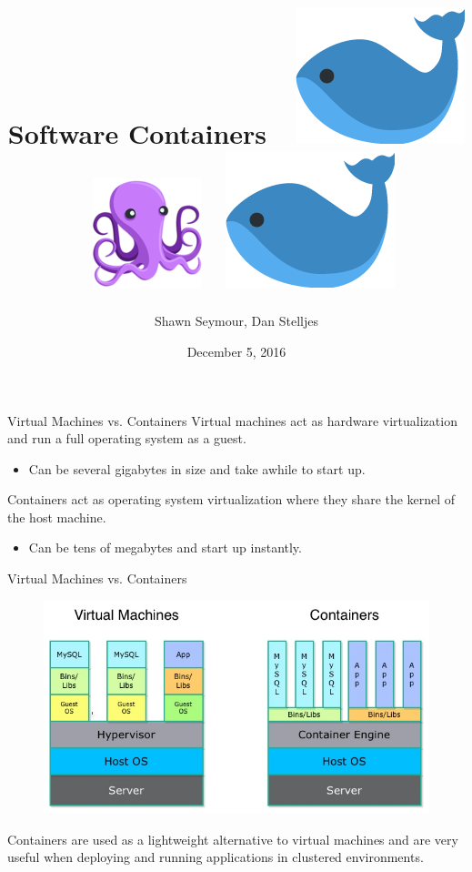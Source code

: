 \documentclass[xcolor=dvipsnames,aspectratio=1610]{beamer}
\title{Software Containers\ \
\includegraphics[scale=0.1]{whale.png}
\ \includegraphics[scale=0.15]{octopus.png}
\ \includegraphics[scale=0.1]{whale.png}}
\date{December 5, 2016}
\author{Shawn Seymour, Dan Stelljes}
\begin{document}
  \maketitle
  \begin{frame}{Virtual Machines vs. Containers}
      \alert{Virtual machines} act as hardware virtualization and run a full operating system as a guest.
      \begin{itemize}
          \item Can be several gigabytes in size and take awhile to start up.
      \end{itemize}
      \vspace{10px}

      \alert{Containers} act as operating system virtualization where they share the kernel of the host machine.
      \begin{itemize}
          \item Can be tens of megabytes and start up instantly.
      \end{itemize}

  \end{frame}

  \begin{frame}{Virtual Machines vs. Containers}
      \begin{figure}
        \includegraphics[scale=0.5]{container_vs_vm.jpg}
      \end{figure}
      Containers are used as a lightweight alternative to virtual machines and are very useful when deploying and running applications in clustered environments.

    \end{frame}
\end{document}

